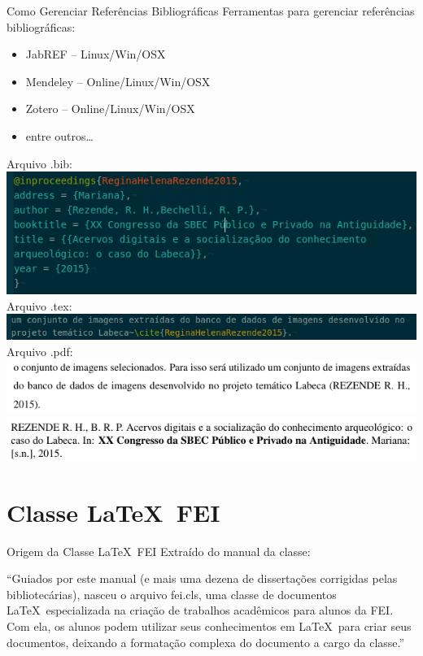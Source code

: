 \documentclass{beamer}
\begin{document}
\begin{frame}{Como Gerenciar Referências Bibliográficas}
    Ferramentas para gerenciar referências bibliográficas:
    \begin{itemize}
        \item JabREF – Linux/Win/OSX
        \item Mendeley – Online/Linux/Win/OSX
        \item Zotero – Online/Linux/Win/OSX
        \item entre outros\dots
    \end{itemize}
\end{frame}

\begin{frame}
    \begin{center}
        Arquivo .bib:
        \includegraphics[width=.8\columnwidth]{bibliografia_bib}\\
        Arquivo .tex:
        \includegraphics[width=.8\columnwidth]{bibliografia_texto}\\
        Arquivo .pdf:
        \includegraphics[width=.8\columnwidth]{bibliografia_output}\\
        \includegraphics[width=.8\columnwidth]{bibliografia_bibtexto}\\
    \end{center}
\end{frame}


\section{Classe \LaTeX~FEI}

\begin{frame}{Origem da Classe \LaTeX~FEI}
    Extraído do manual da classe:

    ``Guiados por este manual (e mais uma dezena de dissertações corrigidas pelas bibliotecárias), nasceu o arquivo fei.cls, uma classe de documentos \LaTeX~especializada na criação de trabalhos acadêmicos para alunos da FEI. Com ela, os alunos podem utilizar seus conhecimentos em \LaTeX~para criar seus documentos, deixando a formatação complexa do documento a cargo da classe.''
\end{frame}
\end{document}
